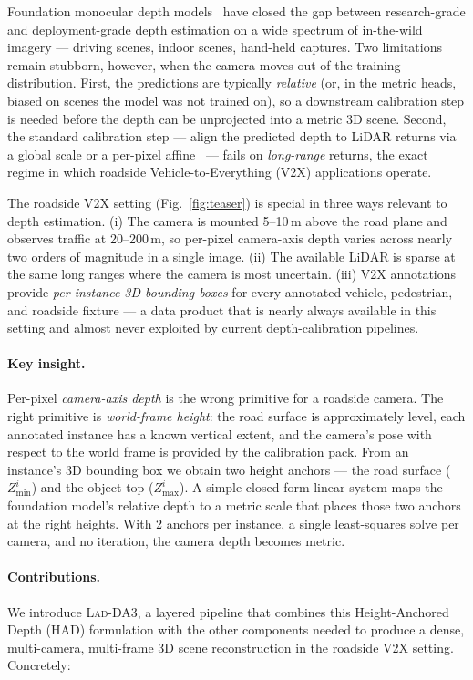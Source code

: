 \documentclass[10pt,twocolumn,letterpaper]{article}
\newcommand{\ourmethod}{\textsc{Lad-DA3}\xspace}
\begin{document}
Foundation monocular depth models~\cite{depthanything3,zoedepth,midas3}
have closed the gap between research-grade and deployment-grade depth
estimation on a wide spectrum of in-the-wild imagery — driving scenes,
indoor scenes, hand-held captures. Two limitations remain stubborn,
however, when the camera moves out of the training distribution. First,
the predictions are typically \emph{relative} (or, in the metric heads,
biased on scenes the model was not trained on), so a downstream
calibration step is needed before the depth can be unprojected into a
metric 3D scene. Second, the standard calibration step — align the
predicted depth to LiDAR returns via a global scale or a per-pixel
affine~\cite{lidaraligndepth} — fails on \emph{long-range} returns, the
exact regime in which roadside Vehicle-to-Everything (V2X)
applications operate.

The roadside V2X setting (Fig.~\ref{fig:teaser}) is special in three
ways relevant to depth estimation. (i) The camera is mounted 5–10\,m
above the road plane and observes traffic at 20–200\,m, so per-pixel
camera-axis depth varies across nearly two orders of magnitude in a
single image. (ii) The available LiDAR is sparse at the same long
ranges where the camera is most uncertain. (iii) V2X annotations
provide \emph{per-instance 3D bounding boxes} for every annotated
vehicle, pedestrian, and roadside fixture — a data product that is
nearly always available in this setting and almost never exploited
by current depth-calibration pipelines.

\paragraph{Key insight.} Per-pixel \emph{camera-axis depth} is the
wrong primitive for a roadside camera. The right primitive is
\emph{world-frame height}: the road surface is approximately level,
each annotated instance has a known vertical extent, and the camera's
pose with respect to the world frame is provided by the calibration
pack. From an instance's 3D bounding box we obtain two height anchors
— the road surface ($Z_{\min}^i$) and the object top ($Z_{\max}^i$).
A simple closed-form linear system maps the foundation model's relative
depth to a metric scale that places those two anchors at the right
heights. With 2 anchors per instance, a single least-squares solve per
camera, and no iteration, the camera depth becomes metric.

\paragraph{Contributions.} We introduce \ourmethod{}, a layered pipeline
that combines this Height-Anchored Depth (HAD) formulation with the
other components needed to produce a dense, multi-camera, multi-frame
3D scene reconstruction in the roadside V2X setting. Concretely:
\end{document}

